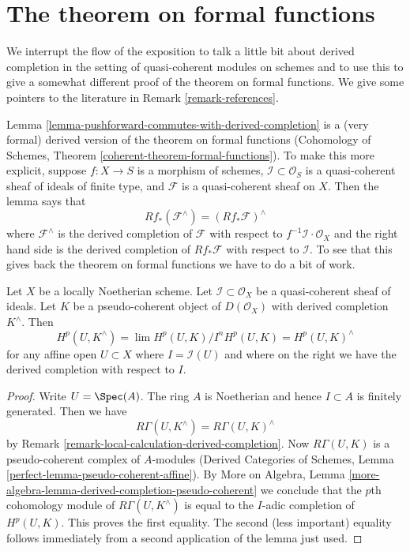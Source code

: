 \section{The theorem on formal functions}
\label{section-formal-functions}

\noindent
We interrupt the flow of the exposition to talk a little bit about
derived completion in the setting of quasi-coherent modules on schemes
and to use this to give a somewhat different proof of the theorem on
formal functions. We give some pointers to the literature in
Remark \ref{remark-references}.

\medskip\noindent
Lemma \ref{lemma-pushforward-commutes-with-derived-completion} is a
(very formal) derived version of the theorem on formal functions
(Cohomology of Schemes, Theorem \ref{coherent-theorem-formal-functions}).
To make this more explicit, suppose $f : X \to S$ is a morphism of schemes,
$\mathcal{I} \subset \mathcal{O}_S$ is a quasi-coherent sheaf of ideals
of finite type,
and $\mathcal{F}$ is a quasi-coherent sheaf on $X$. Then the lemma says that
\begin{equation}
\label{equation-formal-functions}
Rf_*(\mathcal{F}^\wedge) = (Rf_*\mathcal{F})^\wedge
\end{equation}
where $\mathcal{F}^\wedge$ is the derived completion of $\mathcal{F}$
with respect to $f^{-1}\mathcal{I} \cdot \mathcal{O}_X$ and the right
hand side is the derived completion of $Rf_*\mathcal{F}$
with respect to $\mathcal{I}$. To see that this gives back the theorem
on formal functions we have to do a bit of work.

\begin{lemma}
\label{lemma-sections-derived-completion-pseudo-coherent}
Let $X$ be a locally Noetherian scheme. Let $\mathcal{I} \subset \mathcal{O}_X$
be a quasi-coherent sheaf of ideals. Let $K$ be a
pseudo-coherent object of $D(\mathcal{O}_X)$ with derived completion
$K^\wedge$. Then
$$
H^p(U, K^\wedge) = \lim H^p(U, K)/I^nH^p(U, K) =
H^p(U, K)^\wedge
$$
for any affine open $U \subset X$
where $I = \mathcal{I}(U)$ and where on the right we have the derived
completion with respect to $I$.
\end{lemma}

\begin{proof}
Write $U = \Spec(A)$. The ring $A$ is Noetherian
and hence $I \subset A$ is finitely generated. Then we have
$$
R\Gamma(U, K^\wedge) = R\Gamma(U, K)^\wedge
$$
by Remark \ref{remark-local-calculation-derived-completion}.
Now $R\Gamma(U, K)$ is a pseudo-coherent complex of $A$-modules
(Derived Categories of Schemes, Lemma
\ref{perfect-lemma-pseudo-coherent-affine}).
By More on Algebra, Lemma
\ref{more-algebra-lemma-derived-completion-pseudo-coherent}
we conclude that the $p$th cohomology module of $R\Gamma(U, K^\wedge)$
is equal to the $I$-adic completion of $H^p(U, K)$.
This proves the first equality. The second (less important) equality
follows immediately from a second application of the lemma just used.
\end{proof}


